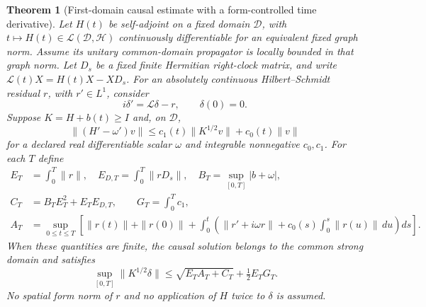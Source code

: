 \documentclass[11pt]{article}
\numberwithin{equation}{section}
\newtheorem{theorem}{Theorem}[section]
\theoremstyle{definition}
\theoremstyle{remark}
\begin{document}
\begin{theorem}[First-domain causal estimate with a form-controlled time derivative]
\label{p4s:thm:temporal}
Let $H(t)$ be self-adjoint on a fixed domain $\mathcal D$, with
$t\mapsto H(t)\in\mathcal L(\mathcal D,\mathcal H)$ continuously
differentiable for an equivalent fixed graph norm. Assume its unitary
common-domain propagator is locally bounded in that graph norm.
Let $D_s$ be a fixed finite Hermitian right-clock matrix, and write
$\mathcal L(t)X=H(t)X-XD_s$.
For an absolutely continuous Hilbert--Schmidt residual $r$, with
$r'\in L^1$, consider
\[
 i\delta'=\mathcal L\delta-r,\qquad \delta(0)=0.
\]
Suppose $K=H+b(t)\geq I$ and, on $\mathcal D$,
\[
 \|(H'-\omega')v\|\leq c_1(t)\|K^{1/2}v\|+c_0(t)\|v\|
\]
for a declared real differentiable scalar $\omega$ and integrable
nonnegative $c_0,c_1$. For each $T$ define
\begin{align*}
 E_T&=\int_0^T\|r\|,\quad E_{D,T}=\int_0^T\|rD_s\|,
       \quad B_T=\sup_{[0,T]}|b+\omega|,\\
 C_T&=B_TE_T^2+E_TE_{D,T},\qquad G_T=\int_0^Tc_1,\\
 A_T&=\sup_{0\leq t\leq T}
 \left[\|r(t)\|+\|r(0)\|+\int_0^t
       \left(\|r'+i\omega r\|+c_0(s)\int_0^s\|r(u)\|\,du\right)ds\right].
\end{align*}
When these quantities are finite, the causal solution belongs to the
common strong domain and satisfies
\begin{equation}\label{p4s:eq:temporal}
 \sup_{[0,T]}\|K^{1/2}\delta\|
       \leq\sqrt{E_TA_T+C_T}+\tfrac12E_TG_T .
\end{equation}
No spatial form norm of $r$ and no application of $H$ twice to
$\delta$ is assumed.
\end{theorem}
\end{document}
